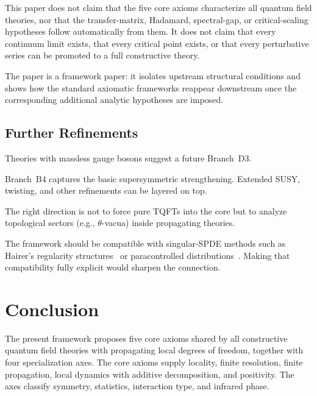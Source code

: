 \documentclass[12pt,a4paper]{article}
\theoremstyle{plain}
\theoremstyle{definition}
\theoremstyle{remark}
\begin{document}
This paper does not claim that the five core axioms characterize all
quantum field theories, nor that the transfer-matrix, Hadamard,
spectral-gap, or critical-scaling hypotheses follow automatically from
them. It does not claim that every continuum limit exists, that every
critical point exists, or that every perturbative series can be
promoted to a full constructive theory.

The paper is a framework paper: it isolates upstream structural
conditions and shows how the standard axiomatic frameworks reappear
downstream once the corresponding additional analytic hypotheses are
imposed.


\subsection{Further Refinements}

\begin{description}[nosep]
\item[Gapless nonconformal spectral branch.] Theories with massless
  gauge bosons suggest a future Branch~D3.
\item[Extended supersymmetry.] Branch~B4 captures the basic
  supersymmetric strengthening. Extended SUSY, twisting, and other
  refinements can be layered on top.
\item[Topological sectors inside dynamical theories.] The right
  direction is not to force pure TQFTs into the core but to analyze
  topological sectors (e.g., $\theta$-vacua) inside propagating
  theories.
\item[Relation to singular SPDE methods.] The framework should be
  compatible with singular-SPDE methods such as Hairer's regularity
  structures~\cite{Hairer2014} or paracontrolled
  distributions~\cite{GIP}. Making that compatibility fully explicit
  would sharpen the connection.
\end{description}


\section{Conclusion}
\label{sec:conclusion}

The present framework proposes five core axioms shared by all
constructive quantum field theories with propagating local degrees of
freedom, together with four specialization axes. The core axioms
supply locality, finite resolution, finite propagation, local dynamics
with additive decomposition, and positivity. The axes classify
symmetry, statistics, interaction type, and infrared phase.
\end{document}
